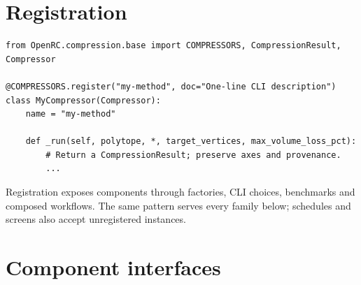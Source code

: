 \documentclass[11pt,a4paper]{report}
\begin{document}
\section{Registration}

\begin{lstlisting}
from OpenRC.compression.base import COMPRESSORS, CompressionResult, Compressor

@COMPRESSORS.register("my-method", doc="One-line CLI description")
class MyCompressor(Compressor):
    name = "my-method"

    def _run(self, polytope, *, target_vertices, max_volume_loss_pct):
        # Return a CompressionResult; preserve axes and provenance.
        ...
\end{lstlisting}

Registration exposes components through factories, CLI choices, benchmarks
and composed workflows. The same pattern serves every family below;
schedules and screens also accept unregistered instances.

\section{Component interfaces}
\end{document}
